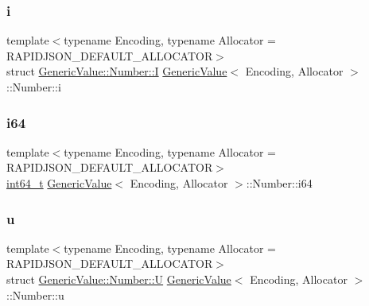 \subsubsection{\texorpdfstring{i}{i}}
{\footnotesize\ttfamily template$<$typename Encoding, typename Allocator = R\+A\+P\+I\+D\+J\+S\+O\+N\+\_\+\+D\+E\+F\+A\+U\+L\+T\+\_\+\+A\+L\+L\+O\+C\+A\+T\+OR$>$ \\
struct \hyperlink{structGenericValue_1_1Number_1_1I}{Generic\+Value\+::\+Number\+::I} \hyperlink{classGenericValue}{Generic\+Value}$<$ Encoding, Allocator $>$\+::Number\+::i}

\mbox{\label{unionGenericValue_1_1Number_ae53d96a8ead92099541da3b71633b77b}} 
\subsubsection{\texorpdfstring{i64}{i64}}
{\footnotesize\ttfamily template$<$typename Encoding, typename Allocator = R\+A\+P\+I\+D\+J\+S\+O\+N\+\_\+\+D\+E\+F\+A\+U\+L\+T\+\_\+\+A\+L\+L\+O\+C\+A\+T\+OR$>$ \\
\hyperlink{stdint_8h_a414156feea104f8f75b4ed9e3121b2f6}{int64\+\_\+t} \hyperlink{classGenericValue}{Generic\+Value}$<$ Encoding, Allocator $>$\+::Number\+::i64}

\mbox{\label{unionGenericValue_1_1Number_a3b5f0986718c830b88d641491248131d}} 
\subsubsection{\texorpdfstring{u}{u}}
{\footnotesize\ttfamily template$<$typename Encoding, typename Allocator = R\+A\+P\+I\+D\+J\+S\+O\+N\+\_\+\+D\+E\+F\+A\+U\+L\+T\+\_\+\+A\+L\+L\+O\+C\+A\+T\+OR$>$ \\
struct \hyperlink{structGenericValue_1_1Number_1_1U}{Generic\+Value\+::\+Number\+::U} \hyperlink{classGenericValue}{Generic\+Value}$<$ Encoding, Allocator $>$\+::Number\+::u}

\mbox{\label{unionGenericValue_1_1Number_a1c8d3c6d226cf74315e233b30b622430}} 
